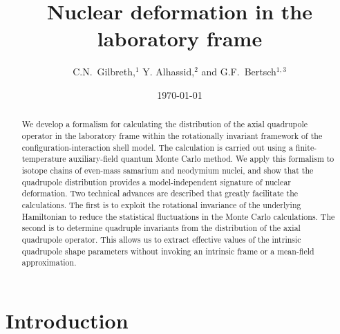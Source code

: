 \documentclass[prc,twocolumn,aps,showpacs,floatfix,nofootinbib,letterpaper,preprintnumbers]{revtex4-1}
\begin{document}

\title{Nuclear deformation in the laboratory frame}
\author{C.N.~Gilbreth,$^{1}$ Y. Alhassid,$^{2}$ and G.F.~Bertsch$^{1,3}$ }
\date{\today}
\def\lb{\langle}
\def\rb{\rangle}
\def\ni{\noindent}
\def\be{\begin{equation}}
\def\ee{\end{equation}}
\def\sumk{\sum_k}
\def\ad{a^\dagger_k}
\def\adb{a^\dagger_{\bar k}}
\def\a{a_k}
\def\ab{a_{\bar k}}
\def\Tr{{\rm Tr}}
\def\tr{{\rm tr}}
\def\Re{{\rm Re\,}}

\begin{abstract}
We develop a formalism for calculating the distribution of the axial quadrupole operator in the laboratory frame  within the rotationally invariant framework of the configuration-interaction shell model.  The calculation is carried out using a finite-temperature auxiliary-field quantum Monte Carlo method.  We apply this formalism to isotope chains of even-mass samarium and neodymium nuclei, and show that the quadrupole distribution provides a model-independent signature of nuclear deformation.  Two technical advances are described that greatly facilitate the calculations.  The first is to exploit the rotational invariance of the underlying Hamiltonian to reduce the statistical fluctuations in the Monte Carlo calculations. The second is to determine quadruple invariants from the distribution of the axial quadrupole operator. This allows us to extract effective values of the intrinsic quadrupole shape parameters without invoking an intrinsic frame or a mean-field approximation. 
\end{abstract}


\maketitle

\section{Introduction}   
\end{document}
